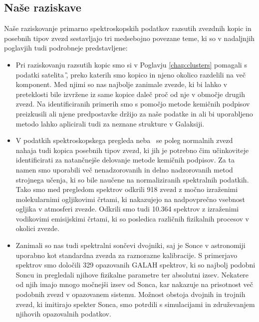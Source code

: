 \subsection{Naše raziskave}
\label{sec:slo_raziskave}
Naše raziskovanje primarno spektroskopskih podatkov razsutih zvezdnih kopic in posebnih tipov zvezd sestavljajo tri medsebojno povezane teme, ki so v nadaljnjih poglavjih tudi podrobneje predstavljene:

\begin{itemize}
	\item Pri raziskovanju razsutih kopic smo si v Poglavju \ref{chap:clusters} pomagali s podatki satelita \G, preko katerih smo kopico in njeno okolico razdelili na več komponent. Med njimi so nas najbolje zanimale zvezde, ki bi lahko v preteklosti bile izvržene iz same kopice daleč proč od nje v območje drugih zvezd. Na identificiranih primerih smo s pomočjo metode kemičnih podpisov preizkusili ali njene predpostavke držijo za naše podatke in ali bi uporabljeno metodo lahko aplicirali tudi za neznane strukture v Galaksiji.
	
	\item V podatkih spektroskopskega pregleda neba \Gh\ se poleg normalnih zvezd nahaja tudi kopica posebnih tipov zvezd, ki jih je potrebno čim učinkoviteje identificirati za natančnejše delovanje metode kemičnih podpisov. Za ta namen smo uporabili več nenadzorovanih in delno nadzorovanih metod strojnega učenja, ki so bile naučene na normaliziranih spektralnih podatkih. Tako smo med pregledom spektrov odkrili 918 zvezd z močno izraženimi molekularnimi ogljikovimi črtami, ki nakazujejo na nadpovprečno vsebnost ogljika v atmosferi zvezde. Odkrili smo tudi 10.364 spektrov z izraženimi vodikovimi emisijskimi črtami, ki so posledica različnih fizikalnih procesov v okolici zvezde. 
		
	\item Zanimali so nas tudi spektralni sončevi dvojniki, saj je Sonce v astronomiji uporabno kot standardna zvezda za raznorazne kalibracije. S primerjavo spektrov smo določili 329 opazovanih GALAH spektrov, ki so najbolj podobni Soncu in pregledali njihove fizikalne parametre ter absolutni izsev. Nekatere od njih imajo mnogo močnejši izsev od Sonca, kar nakazuje na prisotnost več podobnih zvezd v opazovanem sistemu. Možnost obstoja dvojnih in trojnih zvezd, ki imitirajo spekter Sonca, smo potrdili s simulacijami in združevanjem njihovih opazovalnih podatkov.
	
\end{itemize}

